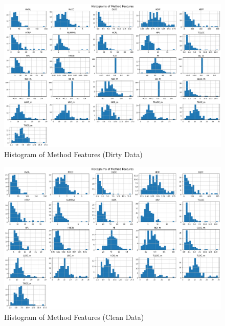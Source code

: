 \begin{landscape}
\begin{figure}[!h]
    \centering
    \includegraphics[height=0.95\textheight]{images/dirty-method.png}
    \caption{Histogram of Method Features (Dirty Data)}
    \label{fig:dirty-method}
\end{figure}
\end{landscape}
\restoregeometry

\begin{landscape}
\begin{figure}[!h]
    \centering
    \includegraphics[height=0.95\textheight]{images/clean-method.png}
    \caption{Histogram of Method Features (Clean Data)}
    \label{fig:clean-method}
\end{figure}
\end{landscape}
\restoregeometry